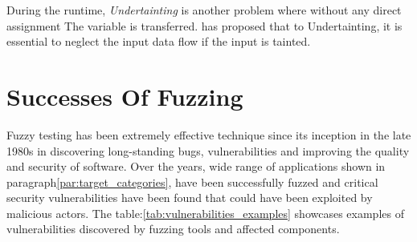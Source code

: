 During the runtime, \textit{Undertainting} is another problem where without any direct assignment The
variable is transferred.  has proposed that to Undertainting, it is essential to
neglect the input data flow if the input is tainted\cite{kang2011dta++}.

\section{Successes Of Fuzzing}
Fuzzy testing has been extremely effective technique since its inception in the late 1980s in discovering
long-standing bugs, vulnerabilities and improving the quality and security of software. Over the years,
wide range of applications shown in paragraph\ref{par:target_categories}, have been successfully fuzzed
and critical security vulnerabilities have been found that could have been exploited by malicious actors.
\clearpage
The table:\ref{tab:vulnerabilities_examples} showcases examples of vulnerabilities discovered by
fuzzing tools and affected components.


